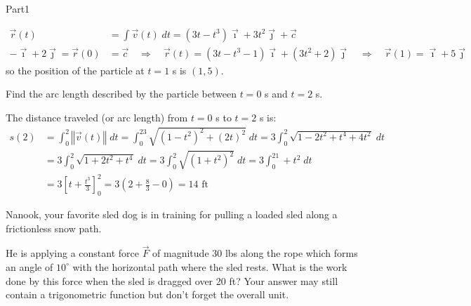 \documentclass{report}
\newcommand{\norm}[1]{\left\Vert #1 \right\Vert}
\newcommand{\vect}[1]{\overrightarrow{#1}}
\begin{document}
\begin{exam}{Part1}
\begin{problem*}[\auto]
\begin{parts}
\begin{solution}[3.5in]
\begin{align*}
\vect{r}(t)&=\int \vect{v}(t)\;dt=(3t-t^3)\vect{\imath}+3t^2\vect{\jmath}+\vect{c}\\
-\vect{\imath}+2\vect{\jmath}=\vect{r}(0)&=\vect{c}\quad\Longrightarrow\quad \vect{r}(t) = (3t-t^3-1)\vect{\imath}+(3t^2+2)\vect{\jmath}\quad\Longrightarrow\quad \vect{r}(1)=\vect{\imath}+5\vect{\jmath}
\end{align*}
so the position of the particle at $t=1$ s is $\boxed{(1,5)}$.
\end{solution}
\item{} Find the arc length described by the particle between $t=0$ s and $t=2$ s.
\begin{solution}[3.5in] The distance traveled (or arc length) from $t=0$ s to $t=2$ s is:
\begin{align*}
s(2)&=\int_0^2 \norm{\vect{v}(t)}\;dt=\int_0^23\sqrt{(1-t^2)^2+(2t)^2}\;dt=3\int_0^2 \sqrt{1-2t^2+t^4+4t^2}\;dt\\
&=3\int_0^2\sqrt{1+2t^2+t^4}\;dt=3\int_0^2\sqrt{(1+t^2)^2}\;dt=3\int_0^21+t^2\;dt\\
&=3\left[t+\frac{t^3}{3}\right]_0^2=3\left(2+\frac{8}{3}-0\right)=\boxed{14\text{ ft}}
\end{align*}
\end{solution}
\end{parts}
\end{problem*}

\begin{problem*}[\auto] Nanook, your favorite sled dog is in training for pulling a loaded sled along a frictionless snow path. 

\begin{parts}
\item{} He is applying a constant force $\vect{F}$ of magnitude 30 lbs along the rope which forms an angle of $10^\circ$ with the horizontal path where the sled rests. What is the work done by this force when the sled is dragged over 20 ft? Your answer may still contain a trigonometric function but don't forget the overall unit.


\end{parts}
\end{problem*}
\end{exam}
\end{document}
